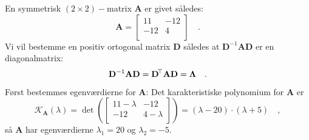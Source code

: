 \begin{example} \label{exampLAbog8.21}
En symmetrisk $(2 \times 2)-$matrix $\mathbf{A}$ er givet således:
\begin{equation}
\mathbf{A} = \left[
               \begin{array}{cc}
                 11 & -12 \\
                 -12 & 4 \\
               \end{array}
             \right]  \quad .
\end{equation}
Vi vil bestemme en positiv ortogonal matrix $\mathbf{D}$ således at $\mathbf{D}^{-1}\mathbf{A}\mathbf{D}$ er en diagonalmatrix:
\begin{equation}
\mathbf{D}^{-1}\mathbf{A}\mathbf{D} = \mathbf{D}\hspace*{-.6mm}^{\top}\mathbf{A}\mathbf{D} =  \mathbf{\Lambda} \quad .
\end{equation}
Først bestemmes egenværdierne for $\mathbf{A}$: Det karakteristiske polynomium for $\mathbf{A}$ er
\begin{equation}
\mathcal{K}_{\mathbf{A}}(\lambda) = \det\left( \left[
                                                 \begin{array}{cc}
                                                   11-\lambda & -12 \\
                                                   -12 & 4-\lambda \\
                                                 \end{array}
                                               \right]
\right)  = (\lambda-20)\cdot(\lambda+5) \quad ,
\end{equation}
så $\mathbf{A}$ har egenværdierne $\lambda_{1} = 20$ og $\lambda_{2} = -5$.\\


\end{example}
